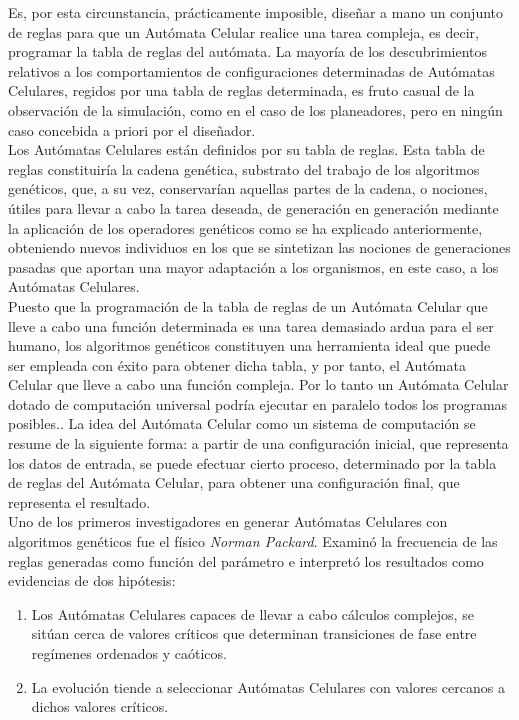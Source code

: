 Es, por esta circunstancia, prácticamente imposible, diseñar a mano un conjunto de reglas para que un Autómata Celular realice una tarea compleja, es decir, programar la tabla de reglas del autómata. La mayoría de los descubrimientos relativos a los comportamientos de configuraciones determinadas de Autómatas Celulares, regidos por una tabla de reglas determinada, es fruto casual de la observación de la simulación, como en el caso de los planeadores, pero en ningún caso concebida a priori por el diseñador.\\

Los Autómatas Celulares están definidos por su tabla de reglas. Esta tabla de reglas constituiría la cadena genética, substrato del trabajo de los algoritmos genéticos, que, a su vez, conservarían aquellas partes de la cadena, o nociones, útiles para llevar a cabo la tarea deseada, de generación en generación mediante la aplicación de los operadores genéticos como se ha explicado anteriormente, obteniendo nuevos individuos en los que se sintetizan las nociones de generaciones pasadas que aportan una mayor adaptación a los organismos, en este caso, a los Autómatas Celulares.\\

Puesto que la programación de la tabla de reglas de un Autómata Celular que lleve a cabo una función determinada es una tarea demasiado ardua para el ser humano, los algoritmos genéticos constituyen una herramienta ideal que puede ser empleada con éxito para obtener dicha tabla, y por tanto, el Autómata Celular que lleve a cabo una función compleja. Por lo tanto un Autómata Celular dotado de computación universal podría ejecutar en paralelo todos los programas posibles.. La idea del Autómata Celular como un sistema de computación se resume de la siguiente forma: a partir de una configuración inicial, que representa los datos de entrada, se puede efectuar cierto proceso, determinado por la tabla de reglas del Autómata Celular, para obtener una configuración final, que representa el resultado.\\

Uno de los primeros investigadores en generar Autómatas Celulares con algoritmos genéticos fue el físico \textit{Norman Packard}. Examinó la frecuencia de las reglas generadas como función del parámetro e interpretó los resultados como evidencias de dos hipótesis:
\begin{enumerate}
\item Los Autómatas Celulares capaces de llevar a cabo cálculos complejos, se sitúan cerca de valores críticos que determinan transiciones de fase entre regímenes ordenados y caóticos.
\item La evolución tiende a seleccionar Autómatas Celulares con valores cercanos a dichos valores críticos.
\end{enumerate}

